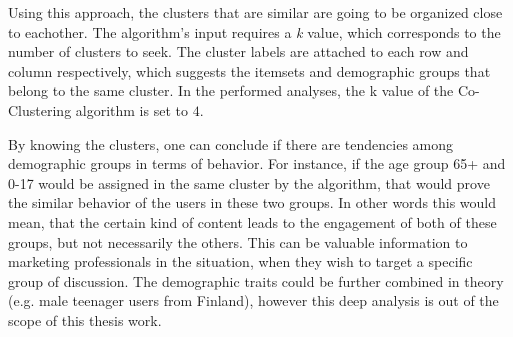     Using this approach, the clusters that are similar are going to be organized close to eachother. The algorithm's input requires a \emph{k} value, which corresponds to the number of clusters to seek. The cluster labels are attached to each row and column respectively, which suggests the itemsets and demographic groups that belong to the same cluster. In the performed analyses, the k value of the Co-Clustering algorithm is set to $4$. 

    By knowing the clusters, one can conclude if there are tendencies among demographic groups in terms of behavior. For instance, if the age group 65+ and 0-17 would be assigned in the same cluster by the algorithm, that would prove the similar behavior of the users in these two groups. In other words this would mean, that the certain kind of content leads to the engagement of both of these groups, but not necessarily the others. This can be valuable information to marketing professionals in the situation, when they wish to target a specific group of discussion. The demographic traits could be further combined in theory (e.g. male teenager users from Finland), however this deep analysis is out of the scope of this thesis work. 